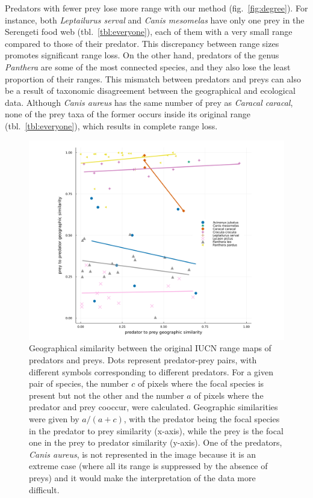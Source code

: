 \documentclass[10pt,oneside]{article}
\makeatletter
\def\maxwidth{\ifdim\Gin@nat@width>\linewidth\linewidth
\else\Gin@nat@width\fi}
\let\Oldincludegraphics\includegraphics
\renewcommand{\includegraphics}[1]{\Oldincludegraphics[width=\maxwidth]{#1}}
\makeatother
\begin{document}
Predators with fewer prey lose more range with our method
(fig.~\ref{fig:degree}). For instance, both \emph{Leptailurus serval}
and \emph{Canis mesomelas} have only one prey in the Serengeti food web
(tbl.~\ref{tbl:everyone}), each of them with a very small range compared
to those of their predator. This discrepancy between range sizes
promotes significant range loss. On the other hand, predators of the
genus \emph{Panthera} are some of the most connected species, and they
also lose the least proportion of their ranges. This mismatch between
predators and preys can also be a result of taxonomic disagreement
between the geographical and ecological data. Although \emph{Canis
aureus} has the same number of prey as \emph{Caracal caracal}, none of
the prey taxa of the former occurs inside its original range
(tbl.~\ref{tbl:everyone}), which results in complete range loss.

\begin{figure}
\hypertarget{fig:geo_diss}{%
\centering
\includegraphics{figures/beta-div_pred-species.png}
\caption{Geographical similarity between the original IUCN range maps of
predators and preys. Dots represent predator-prey pairs, with different
symbols corresponding to different predators. For a given pair of
species, the number \(c\) of pixels where the focal species is present
but not the other and the number \(a\) of pixels where the predator and
prey cooccur, were calculated. Geographic similarities were given by
\(a/(a+c)\), with the predator being the focal species in the predator
to prey similarity (x-axis), while the prey is the focal one in the prey
to predator similarity (y-axis). One of the predators, \emph{Canis
aureus}, is not represented in the image because it is an extreme case
(where all its range is suppressed by the absence of preys) and it would
make the interpretation of the data more difficult.}\label{fig:geo_diss}
}
\end{figure}
\end{document}
